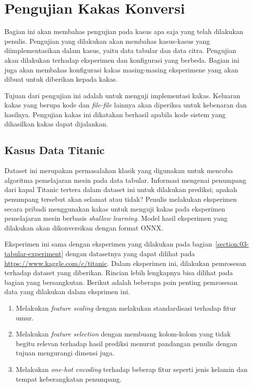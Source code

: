 
\section{Pengujian Kakas Konversi}

Bagian ini akan membahas pengujian pada kasus apa saja yang telah dilakukan penulis.
Pengujian yang dilakukan akan membahas kasus-kasus yang diimplementasikan dalam kasus, yaitu data tabular dan data citra.
Pengujian akan dilakukan terhadap eksperimen dan konfigurasi yang berbeda.
Bagian ini juga akan membahas konfigurasi kakas masing-masing eksperimene yang akan dibuat untuk diberikan kepada kakas.

Tujuan dari pengujian ini adalah untuk menguji implementasi kakas.
Keluaran kakas yang berupa kode dan \textit{file-file} lainnya akan diperiksa untuk kebenaran dan hasilnya.
Pengujian kakas ini dikatakan berhasil apabila kode sistem yang dihasilkan kakas dapat dijalankan.

\subsection{Kasus Data Titanic}

Dataset ini merupakan permasalahan klasik yang digunakan untuk mencoba algoritma pemelajaran mesin pada data tabular.
Informasi mengenai penumpang dari kapal Titanic tertera dalam dataset ini untuk dilakukan prediksi; apakah penumpang tersebut akan selamat atau tidak?
Penulis melakukan eksperimen secara pribadi menggunakan kakas  untuk menguji kakas pada eksperimen pemelajaran mesin berbasis \textit{shallow learning}.
Model hasil eksperimen yang dilakukan akan dikonversikan dengan format ONNX.\@

Eksperimen ini sama dengan eksperimen yang dilakukan pada bagian~\ref{section:03-tabular-experiment} dengan datasetnya yang dapat dilihat pada \url{https://www.kaggle.com/c/titanic}.
Dalam eksperimen ini, dilakukan pemrosesan terhadap dataset yang diberikan.
Rincian lebih lengkapnya bisa dilihat pada bagian yang bersangkutan.
Berikut adalah beberapa poin penting pemrosesan data yang dilakukan dalam eksprimen ini.

\begin{enumerate}
	\item Melakukan \textit{feature scaling} dengan melakukan standardisasi terhadap fitur umur.
	\item Melakukan \textit{feature selection} dengan membuang kolom-kolom yang tidak begitu relevan terhadap hasil prediksi menurut pandangan penulis dengan tujuan mengurangi dimensi juga.
	\item Melakukan \textit{one-hot encoding} terhadap beberap fitur seperti jenis kelamin dan tempat keberangkatan penumpang.
\end{enumerate}

